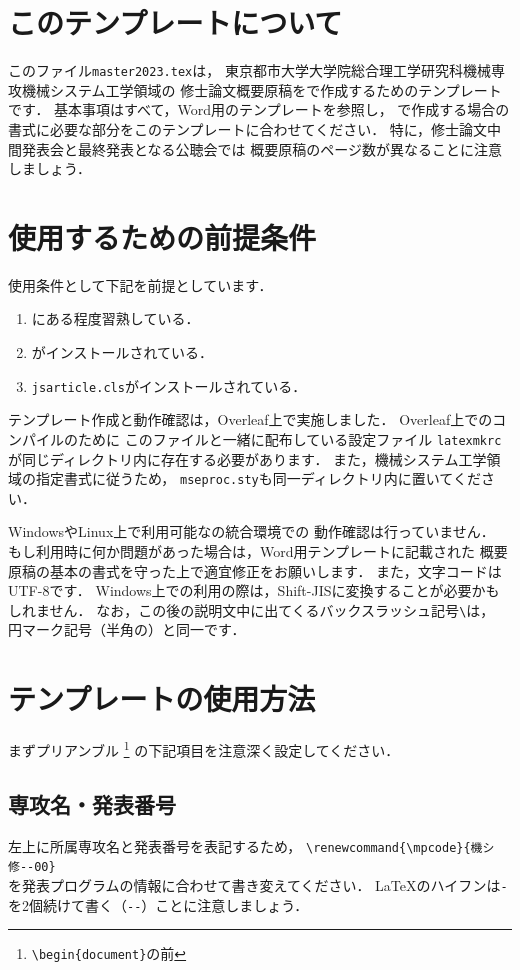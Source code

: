 \documentclass[twocolumn]{jsarticle}
\renewcommand{\mplab}{機械専攻~機械システム工学領域}
\renewcommand{\mpcode}{機シ修--00}
\begin{document}
\mtitle

\section{このテンプレートについて}
このファイル\texttt{master2023.tex}は，
東京都市大学大学院総合理工学研究科機械専攻機械システム工学領域の
修士論文概要原稿を\LaTeXe で作成するためのテンプレートです．
基本事項はすべて，Word用のテンプレート\cite{msetemplateM}を参照し，
\LaTeXe で作成する場合の書式に必要な部分をこのテンプレートに合わせてください．
特に，修士論文中間発表会と最終発表となる公聴会では
概要原稿のページ数が異なることに注意しましょう．

\section{使用するための前提条件}
使用条件として下記を前提としています．
\begin{enumerate}
\item \LaTeXe にある程度習熟している\cite{Okumura2023}．
\item \pLaTeXe がインストールされている． %
\item \texttt{jsarticle.cls}がインストールされている\cite{Okumura2023}．
\end{enumerate}

テンプレート作成と動作確認は，Overleaf上で実施しました．
Overleaf上でのコンパイルのために
このファイルと一緒に配布している設定ファイル
\texttt{latexmkrc}が同じディレクトリ内に存在する必要があります．
また，機械システム工学領域の指定書式に従うため，
\texttt{mseproc.sty}も同一ディレクトリ内に置いてください．

WindowsやLinux上で利用可能な\LaTeXe の統合環境での
動作確認は行っていません．
もし利用時に何か問題があった場合は，Word用テンプレートに記載された
概要原稿の基本の書式を守った上で適宜修正をお願いします．
また，文字コードはUTF-8です．
Windows上での利用の際は，Shift-JISに変換することが必要かもしれません．
なお，この後の説明文中に出てくるバックスラッシュ記号\verb+\+は，
円マーク記号（半角の\yen）と同一です．


\section{テンプレートの使用方法}
まずプリアンブル
\footnote{\verb+\begin{document}+の前}
の下記項目を注意深く設定してください．

\subsection{専攻名・発表番号}
左上に所属専攻名と発表番号を表記するため，
\verb+\renewcommand{\mpcode}{機シ修--00}+ \\
を発表プログラムの情報に合わせて書き変えてください．
\LaTeX のハイフンは\verb+-+を2個続けて書く（\verb+--+）ことに注意しましょう．
\end{document}
